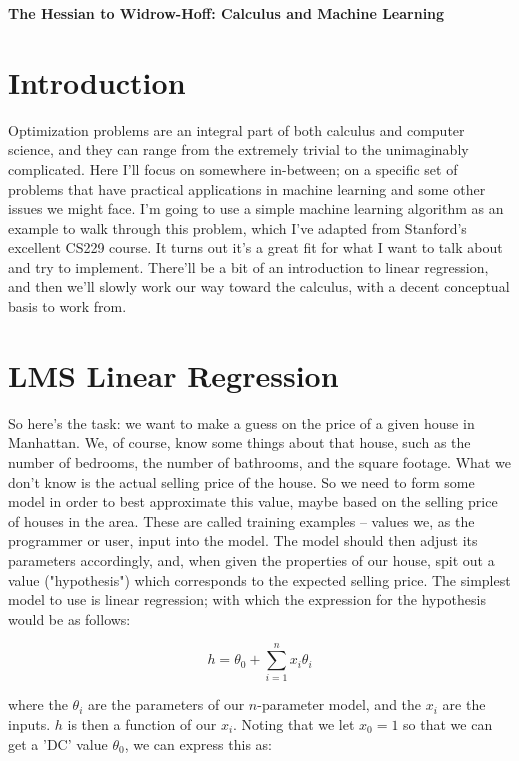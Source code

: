 \documentclass{article}
\begin{document}
\date{}

{\Large
\textbf{The Hessian to Widrow-Hoff: Calculus and Machine Learning}
}

\section{Introduction}
Optimization problems are an integral part of both calculus and computer science, and they can range from the extremely trivial to the unimaginably complicated. Here I'll focus on somewhere in-between; on a specific set of problems that have practical applications in machine learning and some other issues we might face. I'm going to use a simple machine learning algorithm as an example to walk through this problem, which I've adapted from Stanford's excellent CS229 course. It turns out it's a great fit for what I want to talk about and try to implement. There'll be a bit of an introduction to linear regression, and then we'll slowly work our way toward the calculus, with a decent conceptual basis to work from.

\section{LMS Linear Regression}
So here's the task: we want to make a guess on the price of a given house in Manhattan. We, of course, know some things about that house, such as the number of bedrooms, the number of bathrooms, and the square footage. What we don't know is the actual selling price of the house. So we need to form some model in order to best approximate this value, maybe based on the selling price of houses in the area. These are called training examples – values we, as the programmer or user, input into the model. The model should then adjust its parameters accordingly, and, when given the properties of our house, spit out a value ("hypothesis") which corresponds to the expected selling price. The simplest model to use is linear regression; with which the expression for the hypothesis would be as follows:

\begin{equation}
h = \theta_{0} + \sum_{i=1}^{n} x_{i} \theta_{i}
\end{equation}

where the \(\theta_{i}\) are the parameters of our \(n\)-parameter model, and the \(x_{i}\) are the inputs. \(h\) is then a function of our \(x_{i}\). Noting that we let \(x_{0} = 1\) so that we can get a 'DC' value \( \theta_{0} \), we can express this as:
\end{document}
